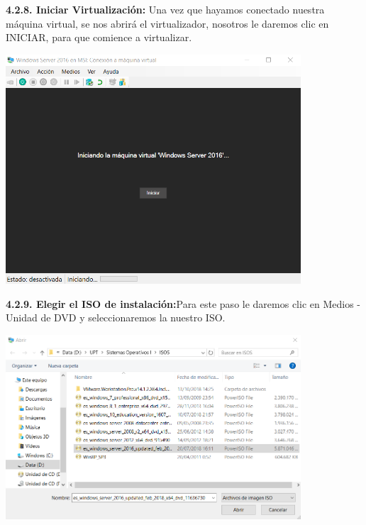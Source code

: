\textbf {4.2.8. Iniciar Virtualización:} Una vez que hayamos conectado nuestra máquina virtual, se nos abrirá el virtualizador, nosotros le daremos clic en INICIAR, para que comience a virtualizar.
\begin{center}
  \includegraphics[width=11cm]{Imagenes/Iniciar_Virtualizacion.png}
\end{center}
\break

\textbf {4.2.9. Elegir el ISO de instalación:}Para este paso le daremos clic en Medios - Unidad de DVD y seleccionaremos la nuestro ISO.
\begin{center}
  \includegraphics[width=11cm]{Imagenes/Elegir_ISO.png}
\end{center}

